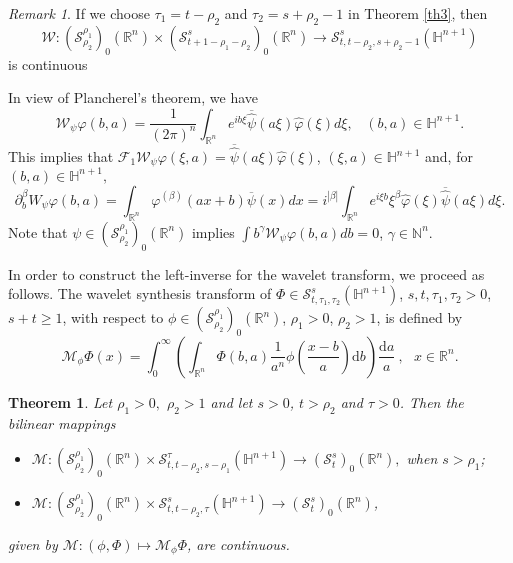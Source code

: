 \documentclass[reqno,12pt]{amsart}
\theoremstyle{plain}
\newtheorem{theorem}{Theorem}
\theoremstyle{definition}
\theoremstyle{remark}
\newtheorem{remark}{Remark}
\begin{document}
\par

\begin{remark}\label{rk2} If we choose
$ \tau_1 = t- \rho_2 $ and $ \tau_2 = s +
 \rho_2  -1 $ in Theorem \ref{th3}, then
$$
{\mathcal W} : ({\mathcal S}^{\rho_1} _ {\rho_2})_0
(\mathbb{R}^n) \times ({\mathcal S}^{s}_{t + 1
- \rho_1 - \rho_2})_0 (\mathbb{R}^n) \to
{\mathcal S}^{s}_{t, t- \rho_2, s +
 \rho_2  -1} (\mathbb{H}^{n+1})
$$
is continuous
\end{remark}

\par

In view of Plancherel's theorem, we have
$$
{\mathcal W}_{\psi} \varphi (b, a) = \frac{1}{(2\pi)^n} \int_{\mathbb{R}^{n}} e^{ib\xi
}\overline{\hat{\psi}} (a\xi) \hat \varphi (\xi) d\xi, \;\;\; (b, a)
\in  \mathbb{H}^{n+1}.
$$
This implies that $ \mathcal{F}_1 {\mathcal
W}_{\psi} \varphi (\xi, a) = \overline{\hat{\psi}} (a\xi) \hat
\varphi (\xi)$, $  (\xi, a) \in  \mathbb{H}^{n+1}$ and, for $  (b,
a) \in  \mathbb{H}^{n+1}, $
$$
\partial_b ^\beta W_{\psi} \varphi (b,a) = \int_{\mathbb{R}^{n}} \varphi ^{(\beta)} (ax + b) \overline{\psi} (x) dx
= i^{|\beta|} \int_{\mathbb{R}^{n}} e^{i\xi b} \xi^{\beta} \hat{\varphi} (\xi)\overline{\hat{\psi}} (a\xi) d\xi.
$$
Note that  $ \psi \in ({\mathcal S}^{\rho_1} _ { \rho_2})_0
(\mathbb{R}^n) $ implies  $ \int b^\gamma {\mathcal W}_{\psi}
\varphi (b, a)  db = 0$, $ \gamma \in \mathbb{N}^n$.

\par

In order to construct the left-inverse for the wavelet transform, we
proceed as follows. The wavelet synthesis transform of $ \Phi \in
{\mathcal S}^{s}_{t, \tau_1, \tau_2} (\mathbb{H}^{n+1}) $, $ s, t,
\tau_1, \tau_2 > 0 $, $ s+t \geq 1$, with respect to $\phi  \in
({\mathcal S}^{\rho_1} _ {\rho_2})_0 (\mathbb{R}^n) $,  $ \rho_1>0$,
$ \rho_2 >1$, is defined by
$$
\mathcal{M}_{\phi} \Phi(x) = \int^{\infty}_{0} \left(
\int_{\mathbb{R}^{n}} \Phi(b,a) \frac{1}{a^{n}} \phi
\left(\frac{x-b}{a} \right)\mathrm{d}b \right) \frac{
\mathrm{d}a}{a}\: , \ \ \ x \in \mathbb{R}^{n}.
$$

\par

\begin{theorem} \label{th4} Let  $ \rho_1 > 0,$ $ \rho_2 > 1 $ and let
$s > 0$, $ t > \rho_2 $ and $ \tau > 0 $. Then the bilinear mappings
\begin{itemize}
\item[a)]$ \displaystyle {\mathcal M} : ({\mathcal S}^{\rho_1} _ {\rho_2})_0
(\mathbb{R}^n) \times {\mathcal S}^{\tau}_{t, t - \rho_2, s - \rho_1} (\mathbb{H}^{n+1})
\to ({\mathcal S}^{s}_{t})_0
(\mathbb{R}^n), $ when $ s > \rho_1$;
\item[b)]$ \displaystyle
 {\mathcal M} : ({\mathcal S}^{\rho_1} _ {\rho_2})_0
(\mathbb{R}^n) \times {\mathcal S}^{s}_{t,t - \rho_2, \tau}
(\mathbb{H}^{n+1}) \to ({\mathcal S}^{s}_{t})_0 (\mathbb{R}^n) $,
\end{itemize}
given by $ {\mathcal M}: (\phi, \Phi) \mapsto {\mathcal M}_{\phi} \Phi $,
are continuous.
\end{theorem}
\end{document}
